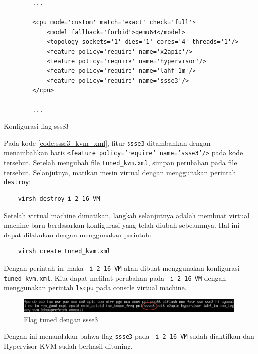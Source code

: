 \begin{listing}[H]
    \begin{verbatim}
        ...

        <cpu mode='custom' match='exact' check='full'>
            <model fallback='forbid'>qemu64</model>
            <topology sockets='1' dies='1' cores='4' threads='1'/>
            <feature policy='require' name='x2apic'/>
            <feature policy='require' name='hypervisor'/> 
            <feature policy='require' name='lahf_1m'/>
            <feature policy='require' name='ssse3'/>
        </cpu>
        
        ...
    \end{verbatim}
    \caption{Konfigurasi flag ssse3}
    \label{code:ssse3_kvm_xml}
\end{listing}

Pada kode \ref{code:ssse3_kvm_xml}, fitur \texttt{ssse3} ditambahkan dengan menambahkan baris \texttt{<feature policy='require' name='ssse3'/>} pada kode tersebut. Setelah mengubah file \texttt{tuned\_kvm.xml}, simpan perubahan pada file tersebut. Selanjutnya, matikan mesin virtual dengan menggunakan perintah \texttt{destroy}:

\begin{verbatim}
    virsh destroy i-2-16-VM
\end{verbatim}

Setelah virtual machine dimatikan, langkah selanjutnya adalah membuat virtual machine baru berdasarkan konfigurasi yang telah diubah sebelumnya. Hal ini dapat dilakukan dengan menggunakan perintah:

\begin{verbatim}
    virsh create tuned_kvm.xml
\end{verbatim}

Dengan perintah ini maka \vm\ \texttt{i-2-16-VM} akan dibuat menggunakan konfigurasi \texttt{tuned\_kvm.xml}. Kita dapat melihat perubahan pada \vm\ \texttt{i-2-16-VM} dengan menggunakan perintah \texttt{lscpu} pada console virtual machine.

\begin{figure}
    \centering
    \includegraphics[width=1\textwidth]
    {assets/pics/lscpu_ssse3.jpeg}
    \caption{Flag tuned dengan ssse3}
    \label{fig:lscpu_ssse3}
\end{figure}

Dengan ini menandakan bahwa flag \texttt{ssse3} pada \vm\ \texttt{i-2-16-VM} sudah diaktifkan dan Hypervisor KVM sudah berhasil dituning.

